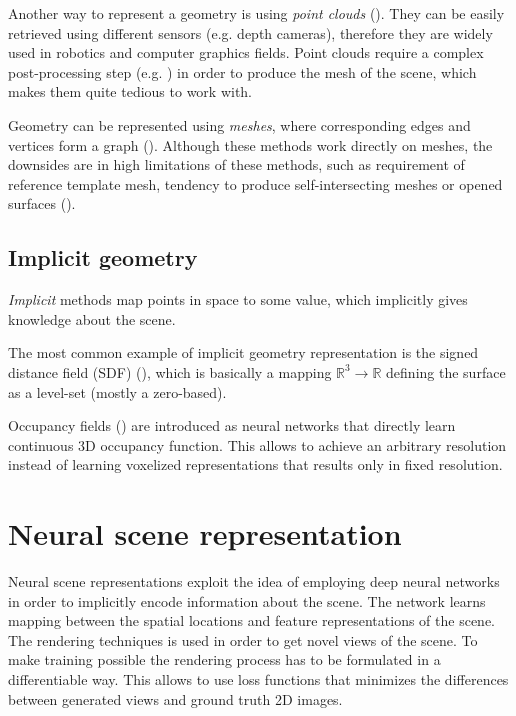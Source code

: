 Another way to represent a geometry is using \textit{point clouds} (\cite{qi2017pointnet, fan2016point}).
They can be easily retrieved using different sensors (e.g. depth cameras),
therefore they are widely used in robotics and computer graphics fields.
Point clouds require a complex post-processing step
(e.g. \cite{ballpivoting1999bernardini}) in order to produce the mesh of the scene,
which makes them quite tedious to work with.

Geometry can be represented using \textit{meshes},
where corresponding edges and vertices form a graph (\cite{wang20183d}).
Although these methods work directly on meshes,
the downsides are in high limitations of these methods,
such as requirement of reference template mesh,
tendency to produce self-intersecting meshes or opened surfaces (\cite{groueix2018atlasnet}).

\subsection{Implicit geometry}

\textit{Implicit} methods map points in space to some value,
which implicitly gives knowledge about the scene.

The most common example of implicit geometry representation is the signed distance field (SDF) (\cite{truncdistfield1996curless, Lombardi_2019}),
which is basically a mapping $\mathbb{R}^3 \xrightarrow{} \mathbb{R}$ defining the surface as a level-set (mostly a zero-based).

Occupancy fields (\cite{occupancy2019mescheder}) are introduced as neural networks
that directly learn continuous 3D occupancy function.
This allows to achieve an arbitrary resolution
instead of learning voxelized representations
that results only in fixed resolution.






\section{Neural scene representation}

Neural scene representations exploit the idea of employing
deep neural networks in order to implicitly encode information about the scene.
The network learns mapping between the spatial locations and feature representations of the scene.
The rendering techniques is used in order to get novel views of the scene.
To make training possible the rendering process has to be formulated in a differentiable way.
This allows to use loss functions that minimizes the differences between generated views and ground truth 2D images.

